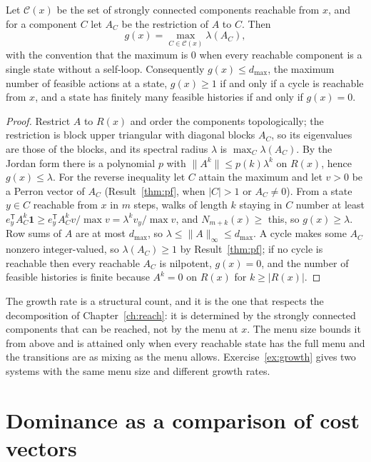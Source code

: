 \begin{newresult}\label{thm:growth}
Let $\mathcal C(x)$ be the set of strongly connected components reachable from $x$, and for a component $C$ let $A_C$ be the restriction of $A$ to $C$. Then
\[
g(x)=\max_{C\in\mathcal C(x)}\lambda(A_C),
\]
with the convention that the maximum is $0$ when every reachable component is a single state without a self-loop. Consequently $g(x)\le d_{\max}$, the maximum number of feasible actions at a state, $g(x)\ge1$ if and only if a cycle is reachable from $x$, and a state has finitely many feasible histories if and only if $g(x)=0$.
\end{newresult}
\begin{proof}
Restrict $A$ to $R(x)$ and order the components topologically; the restriction is block upper triangular with diagonal blocks $A_C$, so its eigenvalues are those of the blocks, and its spectral radius $\lambda$ is $\max_C\lambda(A_C)$. By the Jordan form there is a polynomial $p$ with $\|A^k\|\le p(k)\lambda^k$ on $R(x)$, hence $g(x)\le\lambda$. For the reverse inequality let $C$ attain the maximum and let $v>0$ be a Perron vector of $A_C$ (Result~\ref{thm:pf}, when $|C|>1$ or $A_C\ne0$). From a state $y\in C$ reachable from $x$ in $m$ steps, walks of length $k$ staying in $C$ number at least $e_y^{\mathsf T}A_C^k\mathbf 1\ge e_y^{\mathsf T}A_C^kv/\max v=\lambda^kv_y/\max v$, and $N_{m+k}(x)\ge$ this, so $g(x)\ge\lambda$. Row sums of $A$ are at most $d_{\max}$, so $\lambda\le\|A\|_\infty\le d_{\max}$. A cycle makes some $A_C$ nonzero integer-valued, so $\lambda(A_C)\ge1$ by Result~\ref{thm:pf}; if no cycle is reachable then every reachable $A_C$ is nilpotent, $g(x)=0$, and the number of feasible histories is finite because $A^k=0$ on $R(x)$ for $k\ge|R(x)|$.
\end{proof}

The growth rate is a structural count, and it is the one that respects the decomposition of Chapter~\ref{ch:reach}: it is determined by the strongly connected components that can be reached, not by the menu at $x$. The menu size bounds it from above and is attained only when every reachable state has the full menu and the transitions are as mixing as the menu allows. Exercise~\ref{ex:growth} gives two systems with the same menu size and different growth rates.


\section{Dominance as a comparison of cost vectors}\label{sec:cost-vectors}


